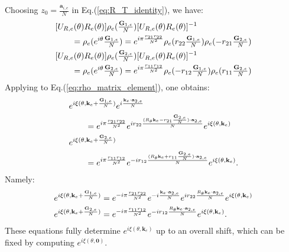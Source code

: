 \begin{subappendices}
    Choosing $z_0=\frac{\mathbf a_{i,e}}{N}$ in Eq.(\ref{eq:R_T_identity}), we have:
    \begin{align}
         & [U_{R,e}(\theta)R_e(\theta)]\rho_e(\tfrac{\mathbf G_{1,e}}{N})[U_{R,e}(\theta)R_e(\theta)]^{-1}\notag                                                                            \\
         & \quad\quad=\rho_e(e^{i\theta}\tfrac{\mathbf G_{1,e}}{N})=e^{i\pi\frac{r_{21}r_{22}}{N^2}}\rho_e(r_{22}\tfrac{\mathbf G_{1,e}}{N})\rho_e(-r_{21}\tfrac{\mathbf G_{2,e}}{N})\notag \\
         & [U_{R,e}(\theta)R_e(\theta)]\rho_e(\tfrac{\mathbf G_{2,e}}{N})[U_{R,e}(\theta)R_e(\theta)]^{-1}\notag                                                                            \\
         & \quad\quad=\rho_e(e^{i\theta}\tfrac{\mathbf G_{2,e}}{N})=e^{i\pi\frac{r_{11}r_{12}}{N^2}}\rho_e(-r_{12}\tfrac{\mathbf G_{1,e}}{N})\rho_e(r_{11}\tfrac{\mathbf G_{2,e}}{N})
    \end{align}
    Applying to Eq.(\ref{eq:rho_matrix_element}), one obtains:
    \begin{align}
         & e^{i\xi(\theta,\mathbf k_e+\frac{\mathbf G_{1,e}}{N})} e^{i\frac{\mathbf k_e\cdot\mathbf a_{2,e}}{N}}\notag                                                               \\
         & \qquad=e^{i\pi\frac{r_{21}r_{22}}{N^2}}e^{ir_{22}\frac{(R_{\theta}\mathbf k_e-r_{21}\frac{\mathbf G_{2,e}}{N})\cdot\mathbf a_{2,e}}{N}}e^{i\xi(\theta,\mathbf k_e)}\notag \\
         & e^{i\xi(\theta,\mathbf k_e+\frac{\mathbf G_{2,e}}{N})}\notag                                                                                                              \\
         & \qquad=e^{i\pi\frac{r_{11}r_{12}}{N^2}}e^{-ir_{12}\frac{(R_{\theta}\mathbf k_e+r_{11}\frac{\mathbf G_{2,e}}{N})\cdot\mathbf a_{2,e}}{N}}e^{i\xi(\theta,\mathbf k_e)}.
    \end{align}
    Namely:
    \begin{align}
        e^{i\xi(\theta,\mathbf k_e+\frac{\mathbf G_{1,e}}{N})} & =e^{-i\pi\frac{r_{21}r_{22}}{N^2}}e^{-i\frac{\mathbf k_e\cdot\mathbf a_{2,e}}{N}}e^{ir_{22}\frac{R_{\theta}\mathbf k_e\cdot\mathbf a_{2,e}}{N}}e^{i\xi(\theta,\mathbf k_e)}\notag \\
        e^{i\xi(\theta,\mathbf k_e+\frac{\mathbf G_{2,e}}{N})} & =e^{-i\pi\frac{r_{11}r_{12}}{N^2}}e^{-ir_{12}\frac{R_{\theta}\mathbf k_e\cdot\mathbf a_{2,e}}{N}}e^{i\xi(\theta,\mathbf k_e)}.
    \end{align}
    These equations fully determine $e^{i\xi(\theta,\mathbf k_e)}$ up to an overall shift, which can be fixed by computing $e^{i\xi(\theta,\mathbf 0)}$.


\end{subappendices}
